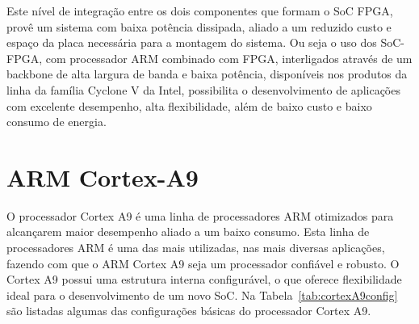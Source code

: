Este nível de integração entre os dois componentes que formam o SoC FPGA, provê um sistema com baixa potência dissipada, aliado a um reduzido custo e  espaço da placa necessária para a montagem do sistema. Ou seja o uso dos SoC-FPGA, com processador ARM combinado com FPGA, interligados através de um backbone de alta largura de banda e baixa potência, disponíveis nos produtos da linha da família Cyclone V da Intel, possibilita o desenvolvimento de aplicações com excelente desempenho, alta flexibilidade, além de baixo custo e baixo consumo de energia. 

\section{ARM Cortex-A9}
O processador Cortex A9 é uma linha de processadores ARM otimizados para alcançarem maior desempenho aliado a um baixo consumo. Esta linha de processadores ARM é uma das mais utilizadas, nas mais diversas aplicações, fazendo com que o ARM Cortex A9 seja um processador confiável e robusto. O Cortex A9 possui uma estrutura interna configurável, o que oferece flexibilidade ideal para o desenvolvimento de um novo SoC.  Na Tabela~\ref{tab:cortexA9config} são listadas algumas das configurações básicas do processador Cortex A9.

